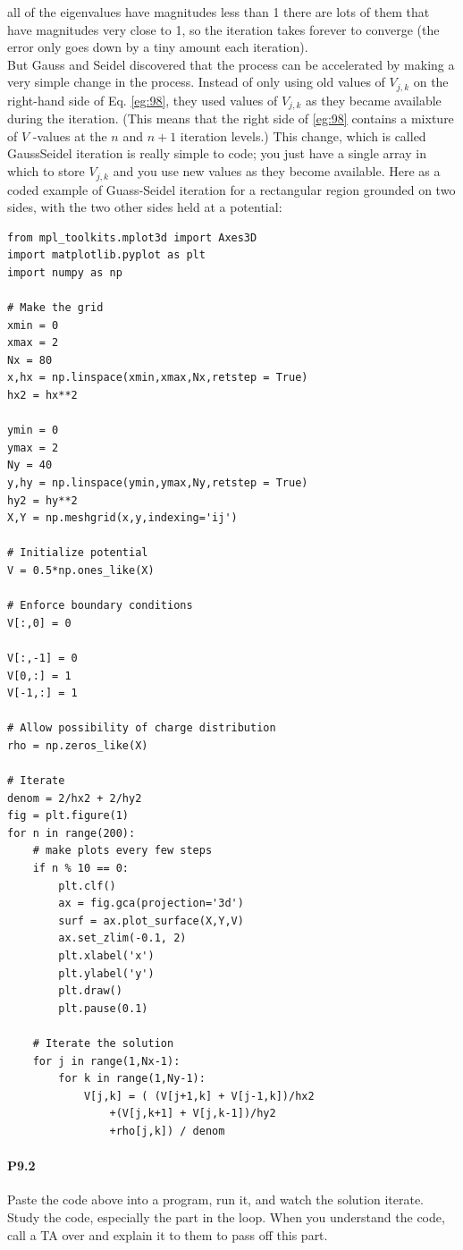 \documentclass{book}
\theoremstyle{plain}
\theoremstyle{definition}
\numberwithin{exm}{chapter}
\theoremstyle{remark}
\theoremstyle{summary}
\theoremstyle{overview}
\begin{document}
all of the eigenvalues have magnitudes less than 1 there are lots of them that have
magnitudes very close to 1, so the iteration takes forever to converge (the error
only goes down by a tiny amount each iteration). \\ 
But Gauss and Seidel discovered that the process can be accelerated by making
a very simple change in the process. Instead of only using old values of $V_{j,k}$ on
the right-hand side of Eq. \eqref{eg:98}, they used values of $V_{j,k}$ as they became available
during the iteration. (This means that the right side of \eqref{eg:98} contains a mixture
of $V$ -values at the $n$ and $n +1$ iteration levels.) This change, which is called GaussSeidel iteration is really simple to code; you just have a single array in which to
store $V_{j,k}$ and you use new values as they become available. Here as a coded
example of Guass-Seidel iteration for a rectangular region grounded on two sides,
with the two other sides held at a potential:
\begin{lstlisting}
from mpl_toolkits.mplot3d import Axes3D
import matplotlib.pyplot as plt
import numpy as np

# Make the grid
xmin = 0
xmax = 2
Nx = 80
x,hx = np.linspace(xmin,xmax,Nx,retstep = True)
hx2 = hx**2

ymin = 0
ymax = 2
Ny = 40
y,hy = np.linspace(ymin,ymax,Ny,retstep = True)
hy2 = hy**2
X,Y = np.meshgrid(x,y,indexing='ij')

# Initialize potential
V = 0.5*np.ones_like(X)

# Enforce boundary conditions
V[:,0] = 0

V[:,-1] = 0
V[0,:] = 1
V[-1,:] = 1

# Allow possibility of charge distribution
rho = np.zeros_like(X)

# Iterate
denom = 2/hx2 + 2/hy2
fig = plt.figure(1)
for n in range(200):
	# make plots every few steps
	if n % 10 == 0:
		plt.clf()
		ax = fig.gca(projection='3d')
		surf = ax.plot_surface(X,Y,V)
		ax.set_zlim(-0.1, 2)
		plt.xlabel('x')
		plt.ylabel('y')
		plt.draw()
		plt.pause(0.1)

	# Iterate the solution
	for j in range(1,Nx-1):
		for k in range(1,Ny-1):
			V[j,k] = ( (V[j+1,k] + V[j-1,k])/hx2
				+(V[j,k+1] + V[j,k-1])/hy2
				+rho[j,k]) / denom
\end{lstlisting}
\paragraph*{P9.2}  Paste the code above into a program, run it, and watch the solution iterate.
Study the code, especially the part in the loop. When you understand the
code, call a TA over and explain it to them to pass off this part.
\end{document}
